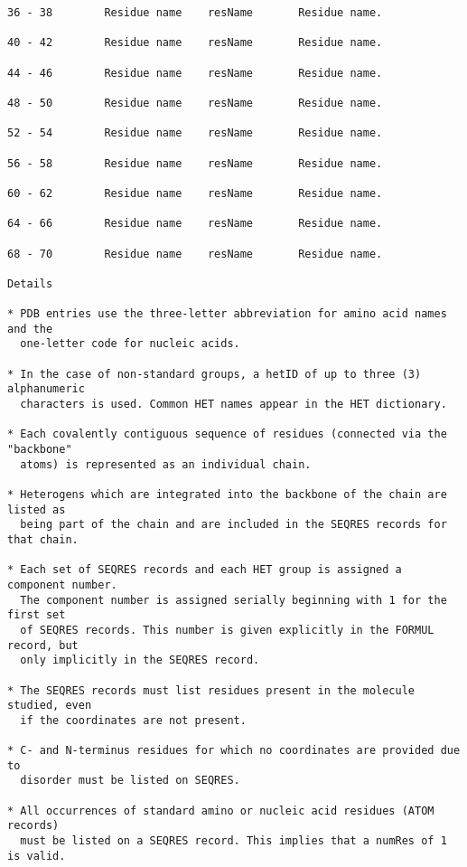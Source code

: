 \begin{lstlisting}
36 - 38        Residue name    resName       Residue name.                        

40 - 42        Residue name    resName       Residue name.                        

44 - 46        Residue name    resName       Residue name.                        

48 - 50        Residue name    resName       Residue name.                        

52 - 54        Residue name    resName       Residue name.                        

56 - 58        Residue name    resName       Residue name.                        

60 - 62        Residue name    resName       Residue name.                        

64 - 66        Residue name    resName       Residue name.                        

68 - 70        Residue name    resName       Residue name.                        

Details 

* PDB entries use the three-letter abbreviation for amino acid names and the
  one-letter code for nucleic acids. 

* In the case of non-standard groups, a hetID of up to three (3) alphanumeric
  characters is used. Common HET names appear in the HET dictionary. 

* Each covalently contiguous sequence of residues (connected via the "backbone"
  atoms) is represented as an individual chain. 

* Heterogens which are integrated into the backbone of the chain are listed as
  being part of the chain and are included in the SEQRES records for that chain. 

* Each set of SEQRES records and each HET group is assigned a component number.
  The component number is assigned serially beginning with 1 for the first set
  of SEQRES records. This number is given explicitly in the FORMUL record, but
  only implicitly in the SEQRES record. 

* The SEQRES records must list residues present in the molecule studied, even
  if the coordinates are not present. 

* C- and N-terminus residues for which no coordinates are provided due to
  disorder must be listed on SEQRES. 

* All occurrences of standard amino or nucleic acid residues (ATOM records)
  must be listed on a SEQRES record. This implies that a numRes of 1 is valid. 


\end{lstlisting}
